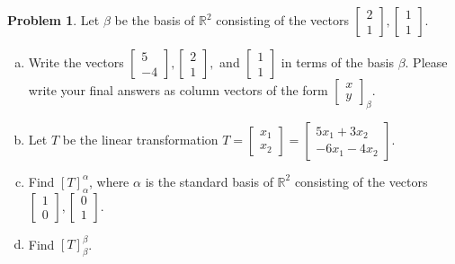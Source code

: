 \documentclass[10pt]{article}
\theoremstyle{definition}
\newtheorem{problem}[theorem]{Problem}
\newcommand{\1}[1]{\textbf{1}_{\left[#1\right]}} %
\def\R{\mathbb{R}} %
\begin{document}
\begin{problem}
  Let $\beta$ be the basis of $\R^{2}$ consisting of the vectors
  $\begin{bmatrix} 2\\1
  \end{bmatrix},
  \begin{bmatrix}
    1\\1
  \end{bmatrix}$. 
  \begin{enumerate}[(a)]
    \setlength{\itemsep}{0pt}
    \item Write the vectors $
    \begin{bmatrix}
      5\\-4
    \end{bmatrix},
    \begin{bmatrix}
      2\\1
    \end{bmatrix},
    $
    and
    $
    \begin{bmatrix}
      1\\1
    \end{bmatrix}
    $ in terms of the basis $\beta$. Please write your final answers as column
    vectors of the form $\begin{bmatrix} x\\y \end{bmatrix}_{\beta}$.
    \item Let $T$ be the linear transformation $T =
    \begin{bmatrix}
      x_{1}\\x_{2}
    \end{bmatrix}=
    \begin{bmatrix}
      5x_{1}+3x_{2}\\
      -6x_{1}-4x_{2}
    \end{bmatrix}$.
    
    \item Find $[T]_{\alpha}^{\alpha}$, where $\alpha$ is the standard basis of $\R^{2}$ consisting of the vectors $
    \begin{bmatrix}
      1\\0
    \end{bmatrix},
    \begin{bmatrix}
      0\\1
    \end{bmatrix}
    $.
    \item Find $[T]_{\beta}^{\beta}$.
  \end{enumerate}
\end{problem}
\end{document}
